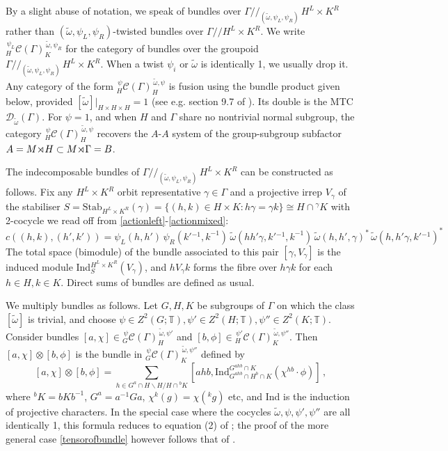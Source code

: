 \documentclass[12pt]{article}
\numberwithin{equation}{section}
\def\cC            {{\mathcal{C}}}
\def\cD            {{\mathcal{D}}}
\def\bbT           {\mathbb{T}}
\def\sdprod{{\times\!\vrule height5pt depth0pt width0.4pt\,}}
\begin{document}
By a slight abuse of notation, we speak of bundles over   $\Gamma/\!/\!{}_{(\tilde{\omega},\psi_L,\psi_R)}\,H^L\times K^R$ rather than $(\tilde{\omega},\psi_L,\psi_R)$-twisted bundles over $\Gamma/\!/H^L\times K^R$. We write ${}_{H}^{\,\psi_L}\cC(\Gamma)_{K}^{\,\tilde{\omega},\psi_R}$ for the category 
of bundles over the groupoid $\Gamma/\!/\!{}_{(\tilde{\omega},\psi_L,\psi_R)}\,H^L\times K^R$. When a 
twist $\psi_i$ or $\widetilde{\omega}$ is identically 1, we usually drop it. Any category of the form ${}_{H}^{\,\psi}\cC(\Gamma)_{H}^{\,\tilde{\omega},\psi}$ is fusion using the bundle product given below, provided $[\widetilde{\omega}]|_{H\times
H\times H}=1$ (see e.g. section 9.7 of \cite{EGNO}). Its double is the MTC $\cD_{\tilde{\omega}}(\Gamma)$. For $\psi=1$, and when $H$ and $\Gamma$ share no nontrivial normal subgroup, the category ${}_{H}^{\,\psi}\cC(\Gamma)_{H}^{\,\tilde{\omega},\psi}$ recovers the $A$-$A$ system of the group-subgroup subfactor $A=M\sdprod H\subset M\sdprod \Gamma=B$.

The  indecomposable bundles of $\Gamma/\!/\!{}_{(\tilde{\omega},\psi_L,\psi_R)}\,H^L\times K^R$ can be constructed  as follows.
Fix any  $H^L\times K^R$ orbit representative $\gamma\in\Gamma$ and a projective irrep
$V_\gamma$ of the stabiliser  $S=\mathrm{Stab}_{H^L\times K^R}(\gamma)=\{(h,k)\in H\times K:h\gamma =\gamma k\}\cong H\cap {}^\gamma K$ with 2-cocycle we read off from \eqref{actionleft}-\eqref{actionmixed}:
\begin{equation}c((h,k),(h',k'))=\psi_L(h,h')\,\psi_R(k'{}^{-1},k^{-1})\,{\widetilde{\omega}(hh'\gamma,k'{}^{-1},k^{-1})}\,
\widetilde{\omega}(h,h',\gamma)^*\,\widetilde{\omega}(h,h'\gamma,k'{}^{-1})^*\label{yetanothercocycle}\end{equation}
 The total space (bimodule) of the bundle associated to this pair $[\gamma,V_\gamma]$
 is the induced module Ind$_S^{H^L\times K^R}(V_\gamma)$, and $hV_\gamma k$ forms the
fibre over $h\gamma k$ for each $h\in H,k\in K$. Direct sums of bundles are defined as usual. 


We multiply bundles as follows. Let $G,H,K$ be subgroups of $\Gamma$ on which {the class $[\widetilde{\omega}]$} is trivial, and choose $\psi\in Z^2(G;\bbT),\psi'\in Z^2(H;\bbT),\psi''\in
Z^2(K;\bbT)$. Consider  bundles $[a,\chi]\in {}_G^{\,\psi}\cC(\Gamma)_H^{\,\tilde{\omega},\psi'}$ and $[b,\phi]\in {}_H^{\,\psi'}\cC(\Gamma)_K^{\,\tilde{\omega},\psi''}$. 
Then $[a,\chi]\otimes[b,\phi]$ is the bundle in $ {}_G^{\,\psi}\cC(\Gamma)_K^{\,\tilde{\omega},\psi''}$
defined by
\begin{equation} \label{tensorofbundle} 
[a,\chi]\otimes[b,\phi]=\sum_{h\in G^a\cap H\backslash H/H\cap{}^bK}\left[ahb,\mathrm{Ind}_{G^{ahb}\cap H^b\cap K}^{G^{ahb}\cap K}({\chi^{hb}}{\cdot} \phi)\right]\,,\end{equation}
where $^bK=bKb^{-1}$, $G^a=a^{-1}Ga$, {$\chi^{k}(g)=\chi({}^kg)$} etc, and Ind is the induction of projective characters. In the special case where {the cocycles $\widetilde{\omega},
\psi,\psi',\psi''$ are all identically 1}, this formula reduces to  equation (2) of  \cite{KMY}; the proof of the more general case \eqref{tensorofbundle} however follows that of \cite{KMY}. 
\end{document}
